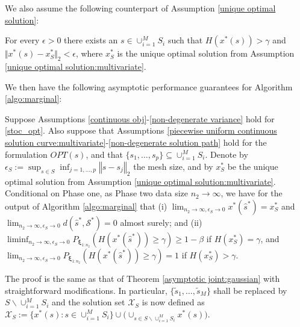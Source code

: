 \documentclass[mnsc,blindrev]{informs4} %
\newcommand{\norm}[1]{\left \Vert #1 \right\Vert}
\begin{document}
We also assume the following counterpart of Assumption \ref{unique optimal solution}:
\begin{assumption}\label{non-degenerate solution path}
For every $\epsilon>0$ there exists an $s\in \cup_{i=1}^MS_i$ such that $H(x^*(s))>\gamma$ and $\Vert x^*(s)-x_S^*\Vert_2<\epsilon$, where $x_S^*$ is the unique optimal solution from Assumption \ref{unique optimal solution:multivariate}.
\end{assumption}
We then have the following asymptotic performance guarantees for Algorithm \ref{algo:marginal}:
\begin{theorem}\label{multivariate asymptotic joint:univariate gaussian}
Suppose Assumptions \ref{continuous obj}-\ref{non-degenerate variance} hold for \eqref{stoc_opt}. Also suppose that Assumptions \ref{piecewise uniform continuous solution curve:multivariate}-\ref{non-degenerate solution path} hold for the formulation $OPT(s)$, and that $\{s_1,\ldots,s_p\}\subseteq \cup_{i=1}^MS_i$. Denote by $\epsilon_S:=\sup_{s\in S}\inf_{j=1,\ldots,p}\norm{s-s_j}_2$ the mesh size, and by $x_S^*$ be the unique optimal solution from Assumption \ref{unique optimal solution:multivariate}. Conditional on Phase one, as Phase two data size $n_2\to\infty$, we have for the output of Algorithm \ref{algo:marginal} that (i) $\lim_{n_2\to\infty,\epsilon_S\to 0}x^*(\hat s^*)=x_S^*$ and $\lim_{n_2\to\infty,\epsilon_S\to 0}d(\hat s^*,\mathcal S^*)=0$ almost surely; and (ii) $\liminf_{n_2\to\infty,\epsilon_S\to 0}P_{\bm{\xi}_{1:n_2}}(H(x^*(\hat s^*))\geq \gamma)\geq 1-\beta$ if $H(x_S^*)=\gamma$, and $\lim_{n_2\to\infty,\epsilon_S\to 0}P_{\bm{\xi}_{1:n_2}}(H(x^*(\hat s^*))\geq \gamma)= 1$ if $H(x_S^*)>\gamma$.
\end{theorem}
The proof is the same as that of Theorem \ref{asymptotic joint:gaussian} with straightforward modifications. In particular, $\{\tilde s_1,\ldots,\tilde s_M\}$ shall be replaced by $S\backslash\cup_{i=1}^MS_i$ and the solution set $\mathcal X_S$ is now defined as $\mathcal X_S:=\{x^*(s):s\in\cup_{i=1}^MS_i\}\cup\big(\cup_{s\in S\backslash\cup_{i=1}^MS_i}x^*(s)\big)$.\hfill\Halmos
\end{document}

